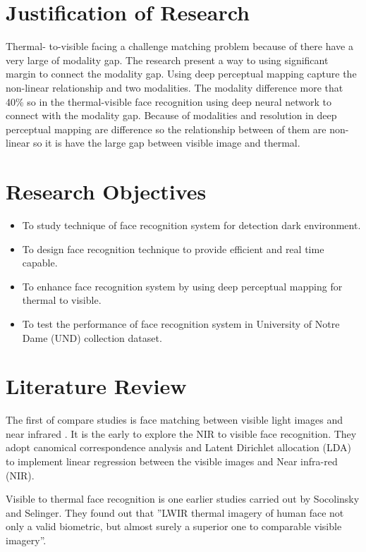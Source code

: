 \documentclass[a4paper, 12pt]{article}
\begin{document}
\section{Justification of Research} 

Thermal- to-visible facing a challenge matching problem because of there have a very large of modality gap. The research present a way to using significant margin to connect the modality gap. Using deep perceptual mapping capture the non-linear relationship and two modalities. The modality difference more that 40\% so in the thermal-visible face recognition using deep neural network to connect with the modality gap. Because of modalities and resolution in deep perceptual mapping are difference so the relationship between of them are non-linear so it is have the large gap between visible image and thermal.

\section{Research Objectives}

\begin{itemize}
  \item To study technique of face recognition system for detection dark environment.
  \item To design face recognition technique to provide efficient and real time capable.
  \item To enhance face recognition system by using deep perceptual mapping for thermal to visible.
  \item To test the performance of face recognition system in University of Notre Dame (UND) collection dataset.
\end{itemize}


\section{Literature Review} 

The first of compare studies is face matching between visible light images and near infrared \cite{20}. It is the early to explore the NIR to visible face recognition. They adopt canomical correspondence analysis and Latent Dirichlet allocation (LDA) to implement linear regression between the visible images and Near infra-red (NIR).

Visible to thermal face recognition \cite{18} is one earlier studies carried out by Socolinsky and Selinger. They found out that ''LWIR thermal imagery of human face not only a valid biometric, but almost surely a superior one to comparable visible imagery''.
\end{document}
